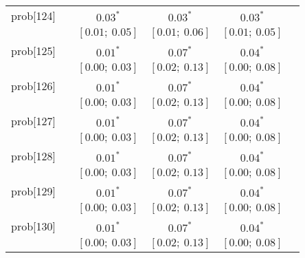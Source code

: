 \begin{table}
\begin{center}
\begin{tabular}{l c c c c c }
prob[124]   &                                  & $0.03^{*}$                & $0.03^{*}$                & $0.03^{*}$              &                         \\
            &                                  & $[0.01;\ 0.05]$           & $[0.01;\ 0.06]$           & $[0.01;\ 0.05]$         &                         \\
prob[125]   &                                  & $0.01^{*}$                & $0.07^{*}$                & $0.04^{*}$              &                         \\
            &                                  & $[0.00;\ 0.03]$           & $[0.02;\ 0.13]$           & $[0.00;\ 0.08]$         &                         \\
prob[126]   &                                  & $0.01^{*}$                & $0.07^{*}$                & $0.04^{*}$              &                         \\
            &                                  & $[0.00;\ 0.03]$           & $[0.02;\ 0.13]$           & $[0.00;\ 0.08]$         &                         \\
prob[127]   &                                  & $0.01^{*}$                & $0.07^{*}$                & $0.04^{*}$              &                         \\
            &                                  & $[0.00;\ 0.03]$           & $[0.02;\ 0.13]$           & $[0.00;\ 0.08]$         &                         \\
prob[128]   &                                  & $0.01^{*}$                & $0.07^{*}$                & $0.04^{*}$              &                         \\
            &                                  & $[0.00;\ 0.03]$           & $[0.02;\ 0.13]$           & $[0.00;\ 0.08]$         &                         \\
prob[129]   &                                  & $0.01^{*}$                & $0.07^{*}$                & $0.04^{*}$              &                         \\
            &                                  & $[0.00;\ 0.03]$           & $[0.02;\ 0.13]$           & $[0.00;\ 0.08]$         &                         \\
prob[130]   &                                  & $0.01^{*}$                & $0.07^{*}$                & $0.04^{*}$              &                         \\
            &                                  & $[0.00;\ 0.03]$           & $[0.02;\ 0.13]$           & $[0.00;\ 0.08]$         &                         \\

\end{tabular}
\end{center}
\end{table}
